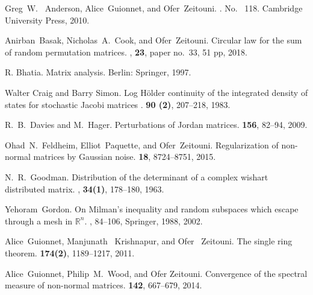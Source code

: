 \documentclass{amsart}
\numberwithin{equation}{section}
\begin{document}
\begin{thebibliography}{99}

Greg~W. ~Anderson,  Alice~Guionnet,  and  Ofer~Zeitouni.
.
\newblock No. ~118. Cambridge University Press, 2010.

Anirban~Basak, Nicholas~A.~Cook, and Ofer~Zeitouni.
\newblock Circular law for the sum of random permutation matrices.
, {\bf 23}, paper no.~33, 51 pp, 2018. 

 R. Bhatia.
  \newblock Matrix analysis.
  \newblock Berlin: Springer, 1997.


Walter Craig and Barry Simon.
\newblock Log H{\"o}lder continuity of the integrated density of states for stochastic Jacobi matrices
.
  {\bf 90 (2)},
  {207--218},
  {1983}.

  R.~B.~Davies and M.~Hager.
  \newblock Perturbations of Jordan matrices.
   {\bf 156}, 82--94, 2009.

Ohad~N.~Feldheim, Elliot~Paquette, and Ofer~Zeitouni.
\newblock Regularization of non-normal matrices by Gaussian noise.
 {\bf 18}, 8724--8751, 2015.

N.~R.~Goodman.
\newblock Distribution of the determinant of a complex wishart distributed matrix.
, {\bf 34(1)}, 178--180, 1963.

Yehoram~Gordon.
\newblock On Milman's inequality and random subspaces which escape through a mesh in $\mathbb{R}^n$.
, {84--106}, Springer, 1988, 2002.

Alice~Guionnet, Manjunath ~Krishnapur,  and Ofer ~Zeitouni.
\newblock The single ring theorem.
 {\bf 174(2)}, 1189--1217, 2011.

 Alice~Guionnet, Philip~M.~Wood, and Ofer Zeitouni.
\newblock Convergence of the spectral measure of non-normal matrices.
 {\bf 142}, 667--679, 2014.


\end{thebibliography}
\end{document}
